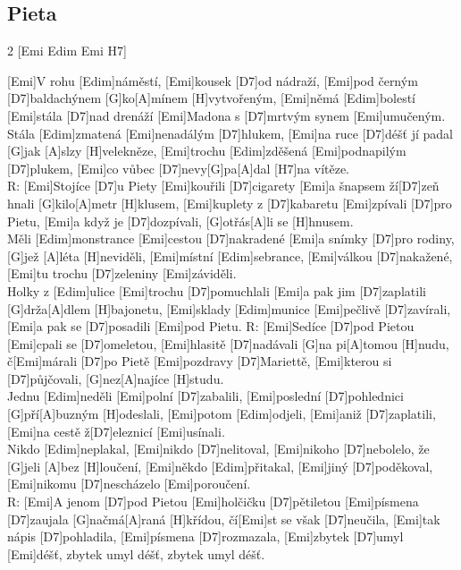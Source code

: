 \documentclass[12pt]{article}
\begin{document}
\subsection{Pieta}
\begin{multicols}{2}
	[Emi  Edim  Emi  H7]
	
	[Emi]V rohu [Edim]náměstí, [Emi]kousek [D7]od nádraží,
	[Emi]pod černým [D7]baldachýnem [G]ko[A]mínem 
	[H]vytvořeným,
	[Emi]němá [Edim]bolestí [Emi]stála [D7]nad drenáží
	[Emi]Madona s [D7]mrtvým synem [Emi]umučeným.
	\\
	[Emi]Stála [Edim]zmatená [Emi]nenadálým [D7]hlukem,
	[Emi]na ruce [D7]déšť jí padal [G]jak [A]slzy [H]velekněze,
	[Emi]trochu [Edim]zděšená [Emi]podnapilým [D7]plukem,
	[Emi]co vůbec [D7]nevy[G]pa[A]dal [H7]na vítěze.
	\\
	R: [Emi]Stojíce [D7]u Piety [Emi]kouřili [D7]cigarety
	[Emi]a šnapsem ží[D7]zeň hnali [G]kilo[A]metr [H]klusem,
	[Emi]kuplety z [D7]kabaretu [Emi]zpívali [D7]pro Pietu,
	[Emi]a když je [D7]dozpívali, [G]otřás[A]li se [H]hnusem.
	\\
	[Emi]Měli [Edim]monstrance [Emi]cestou [D7]nakradené
	[Emi]a snímky [D7]pro rodiny, [G]jež [A]léta [H]neviděli,
	[Emi]místní [Edim]sebrance, [Emi]válkou [D7]nakažené,
	[Emi]tu trochu [D7]zeleniny [Emi]záviděli.
	\\
	[Emi]Holky z [Edim]ulice [Emi]trochu [D7]pomuchlali
	[Emi]a pak jim [D7]zaplatili [G]drža[A]dlem [H]bajonetu,
	[Emi]sklady [Edim]munice [Emi]pečlivě [D7]zavírali,
	[Emi]a pak se [D7]posadili [Emi]pod Pietu.
	\columnbreak
	R: [Emi]Sedíce [D7]pod Pietou [Emi]cpali se [D7]omeletou,
	[Emi]hlasitě [D7]nadávali [G]na pi[A]tomou [H]nudu,
	č[Emi]márali [D7]po Pietě [Emi]pozdravy [D7]Mariettě,
	[Emi]kterou si [D7]půjčovali, [G]nez[A]najíce [H]studu.
	\\
	[Emi]Jednu [Edim]neděli [Emi]polní [D7]zabalili,
	[Emi]poslední [D7]pohlednici [G]pří[A]buzným [H]odeslali,
	[Emi]potom [Edim]odjeli, [Emi]aniž [D7]zaplatili,
	[Emi]na cestě ž[D7]eleznicí [Emi]usínali.
	\\
	[Emi]Nikdo [Edim]neplakal, [Emi]nikdo [D7]nelitoval,
	[Emi]nikoho [D7]nebolelo, že [G]jeli [A]bez [H]loučení,
	[Emi]někdo [Edim]přitakal, [Emi]jiný [D7]poděkoval,
	[Emi]nikomu [D7]nescházelo [Emi]poroučení.
	\\
	R: [Emi]A jenom [D7]pod Pietou [Emi]holčičku [D7]pětiletou
	[Emi]písmena [D7]zaujala [G]načmá[A]raná [H]křídou,
	čí[Emi]st se však [D7]neučila, [Emi]tak nápis [D7]pohladila,
	[Emi]písmena [D7]rozmazala, [Emi]zbytek [D7]umyl [Emi]déšť,
	zbytek umyl déšť, zbytek umyl déšť.
\end{multicols}
\end{document}
